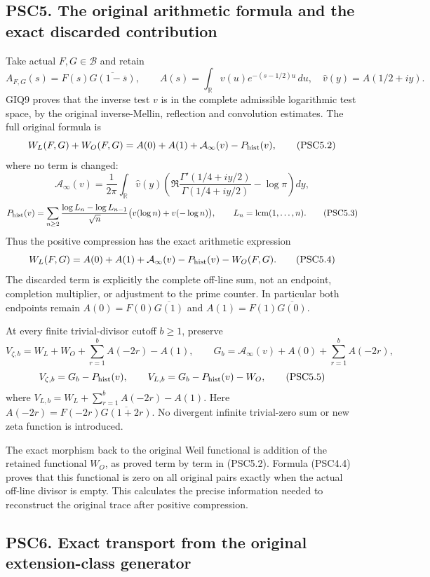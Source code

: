 \subsection{PSC5. The original arithmetic formula and the exact
discarded
contribution}\label{psc5.-the-original-arithmetic-formula-and-the-exact-discarded-contribution}

Take actual \(F,G\in\mathcal B\) and retain \[
A_{F,G}(s)=F(s)\overline{G(1-\overline s)},\qquad
A(s)=\int_{\mathbb R}v(u)e^{-(s-1/2)u}\,du,
\quad\widehat v(y)=A(1/2+iy).
\tag{PSC5.1}
\] GIQ9 proves that the inverse test \(v\) is in the complete admissible
logarithmic test space, by the original inverse-Mellin, reflection and
convolution estimates. The full original formula is \[
W_L(F,G)+W_O(F,G)
=A(0)+A(1)+\mathcal A_\infty(v)-P_{\rm hist}(v),
\tag{PSC5.2}
\] where no term is changed: \[
\mathcal A_\infty(v)=\frac1{2\pi}\int_{\mathbb R}\widehat v(y)
\left(\Re\frac{\Gamma'(1/4+iy/2)}{\Gamma(1/4+iy/2)}-\log\pi\right)dy,
\] \[
P_{\rm hist}(v)=\sum_{n\ge2}\frac{\log L_n-\log L_{n-1}}{\sqrt n}
\bigl(v(\log n)+v(-\log n)\bigr),\qquad L_n=\operatorname{lcm}(1,\ldots,n).
\tag{PSC5.3}
\] Thus the positive compression has the exact arithmetic expression \[
W_L(F,G)=A(0)+A(1)+\mathcal A_\infty(v)-P_{\rm hist}(v)-W_O(F,G).
\tag{PSC5.4}
\] The discarded term is explicitly the complete off-line sum, not an
endpoint, completion multiplier, or adjustment to the prime counter. In
particular both endpoints remain \(A(0)=F(0)\overline{G(1)}\) and
\(A(1)=F(1)\overline{G(0)}\).

At every finite trivial-divisor cutoff \(b\ge1\), preserve \[
V_{\zeta,b}=W_L+W_O+\sum_{r=1}^b A(-2r)-A(1),\qquad
G_b=\mathcal A_\infty(v)+A(0)+\sum_{r=1}^b A(-2r),
\] \[
V_{\zeta,b}=G_b-P_{\rm hist}(v),\qquad
V_{L,b}=G_b-P_{\rm hist}(v)-W_O,
\tag{PSC5.5}
\] where \(V_{L,b}=W_L+\sum_{r=1}^bA(-2r)-A(1)\). Here
\(A(-2r)=F(-2r)\overline{G(1+2r)}\). No divergent infinite trivial-zero
sum or new zeta function is introduced.

The exact morphism back to the original Weil functional is addition of
the retained functional \(W_O\), as proved term by term in (PSC5.2).
Formula (PSC4.4) proves that this functional is zero on all original
pairs exactly when the actual off-line divisor is empty. This calculates
the precise information needed to reconstruct the original trace after
positive compression.

\subsection{PSC6. Exact transport from the original extension-class
generator}\label{psc6.-exact-transport-from-the-original-extension-class-generator}

